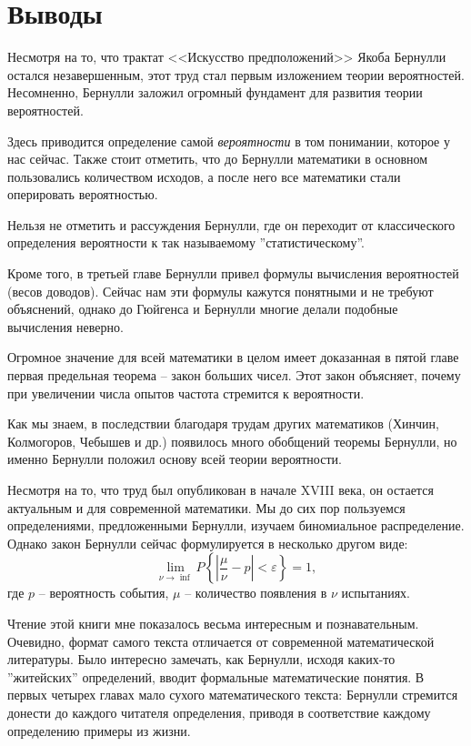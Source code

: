 \documentclass[12pt]{extarticle}
\begin{document}
\newpage
\section{Выводы}
Несмотря на то, что трактат <<Искусство предположений>> Якоба Бернулли остался незавершенным, этот труд стал первым изложением теории вероятностей. 
Несомненно, Бернулли заложил огромный фундамент для развития теории вероятностей.

Здесь приводится определение самой \textit{вероятности} в том понимании, которое у нас сейчас.
Также стоит отметить, что до Бернулли математики в основном пользовались количеством исходов, а после него все математики стали оперировать вероятностью.

Нельзя не отметить и рассуждения Бернулли, где он переходит от классического определения вероятности к так называемому ''статистическому''.

Кроме того, в третьей главе Бернулли привел формулы вычисления вероятностей (весов доводов). Сейчас нам эти формулы кажутся понятными и не требуют объяснений, однако до Гюйгенса и Бернулли многие делали подобные вычисления неверно.

Огромное значение для всей математики в целом имеет доказанная в пятой главе первая предельная теорема -- закон больших чисел.
Этот закон объясняет, почему при увеличении числа опытов частота стремится к вероятности.

Как мы знаем, в последствии благодаря трудам других математиков (Хинчин, Колмогоров, Чебышев и др.) появилось много обобщений теоремы Бернулли, но именно Бернулли положил основу всей теории вероятности.

Несмотря на то, что труд был опубликован в начале XVIII века, он остается актуальным и для современной математики. 
Мы до сих пор пользуемся определениями, предложенными Бернулли, изучаем биномиальное распределение.
Однако закон Бернулли сейчас формулируется в несколько другом виде:
$$\lim\limits_{\nu \to \inf} P \left\{ \left| \frac{\mu}{\nu} - p\right| < \varepsilon \right\} = 1,$$
 где $p$ -- вероятность события, $\mu$ -- количество появления в $\nu$ испытаниях.
 
Чтение этой книги мне показалось весьма интересным и познавательным. 
Очевидно, формат самого текста отличается от современной математической литературы.
Было интересно замечать, как Бернулли, исходя каких-то ''житейских'' определений, вводит формальные математические понятия.
В первых четырех главах мало сухого математического текста: Бернулли стремится донести до каждого читателя определения, приводя в соответствие каждому определению примеры из жизни.
\end{document}
